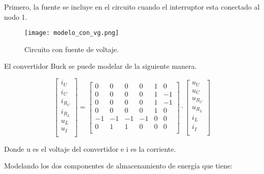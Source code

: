 Primero, la fuente se incluye en el circuito cuando el interruptor esta conectado al nodo 1.

\begin{figure}[H]
    \centering
    \texttt{[image: modelo\_con\_vg.png]}
    \vspace{-0.25cm}
    \caption{Circuito con fuente de voltaje.}
    \label{fig:modelado_con_vg}
\end{figure}

El convertidor Buck se puede modelar de la siguiente manera.

\vspace{-0.5cm}
\begin{equation}
    \begin{bmatrix}
        i_U\\
        i_C\\
        i_{R_C}\\
        i_{R_L}\\
        u_L\\
        u_I\\
    \end{bmatrix}
    =
    \begin{bmatrix}
        0 & 0 & 0 & 0 & 1 & 0\\
        0 & 0 & 0 & 0 & 1 & -1\\
        0 & 0 & 0 & 0 & 1 & -1\\
        0 & 0 & 0 & 0 & 1 & 0\\
        -1 & -1 & -1 & -1 & 0 & 0\\
        0 & 1 & 1 & 0 & 0 & 0\\
    \end{bmatrix}
    \cdot
    \begin{bmatrix}
        u_U\\
        u_C\\
        u_{R_C}\\
        u_{R_L}\\
        i_L\\
        i_I\\
    \end{bmatrix}
\end{equation}

Donde u es el voltaje del convertidor e i es la corriente.

Modelando los dos componentes de almacenamiento de energía que tiene:

